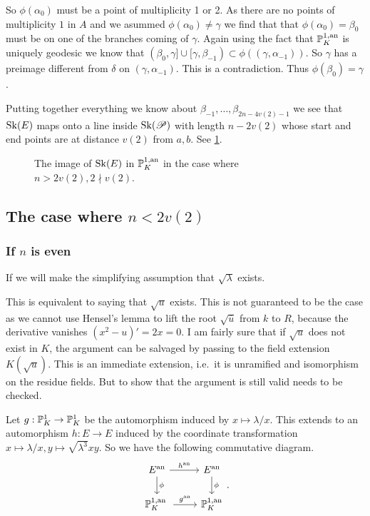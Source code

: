 So $\phi(\alpha_0)$ must be a point of multiplicity 1 or 2. As there are no points of multiplicity $1$ in $A$ and we asummed $\phi(\alpha_0)\ne \gamma$ we find that that $\phi(\alpha_0) = \beta_0$ must be on one of the branches coming of $\gamma$. 
Again using the fact that $\mathbb{P}^{1, \text{an}}_K$ is uniquely geodesic we know that $(\beta_0, \gamma] \cup [\gamma, \beta_{-1}) \subset  \phi((\gamma, \alpha_{-1}))$. 
So $\gamma$ has a preimage different from $\delta$ on $(\gamma, \alpha_{-1})$. 
This is a contradiction. 
Thus $\phi(\beta_0) = \gamma$. 

Putting together everything we know about $\beta_{-1}, \ldots, \beta_{2n - 4v(2)-1}$ we see that $\operatorname{Sk}(E)$ maps onto a line inside $\operatorname{Sk}(\mathscr P)$ with length $n- 2v(2)$ whose start and end points are at distance $v(2)$ from $a, b$.
See \cref{fig:image_between_skeleta_wild_ims}.
\begin{figure}[h]
    \centering
    \caption{The image of $\operatorname{Sk}(E)$ in  $\mathbb{P}^{1, \text{an}}_K$ in the case where $n > 2v(2), 2 \nmid v(2)$.}
    \label{fig:image_between_skeleta_wild_ims}
\end{figure}

\subsection{The case where $n < 2 v(2)$} \label{sec:the_case_where_n_<_2_v2}

\subsubsection{If $n$ is even} \label{sec:if_$n$_is_even}

If we will make the simplifying assumption that $\sqrt{\lambda} $ exists. 
\begin{remark}
	This is equivalent to saying that $\sqrt{u} $ exists.
	This is not guaranteed to be the case as we cannot use Hensel's lemma to lift the root $\sqrt{\overline{u}} $ from $k$ to $R$, because the derivative vanishes $(x^2 - u)' = 2x = 0$. 
	I am fairly sure that if $\sqrt{u} $ does not exist in $ K$, the argument can be salvaged by passing to the field extension $K(\sqrt{u} )$. 
	This is an immediate extension, i.e.\ it is unramified and isomorphism on the residue fields. 
	But to show that the argument is still valid needs to be checked.
\end{remark}

Let $g: \mathbb{P}^{1}_K \to \mathbb{P}^{1}_K$ be the automorphism induced by $x \mapsto \lambda / x$. 
This extends to an automorphism $h: E \to E$ induced by the coordinate transformation $x \mapsto  \lambda / x, y\mapsto \sqrt{\lambda ^3} x y$. 
So we have the following commutative diagram.
\[
\begin{tikzcd}
	E\an \rar{h\an} \dar{\phi} & E\an \dar{\phi} \\
	\pro^{1, \text{an }}_K \rar{g\an} & \pro^{1, \text{an}}_K
\end{tikzcd}
.\] 

